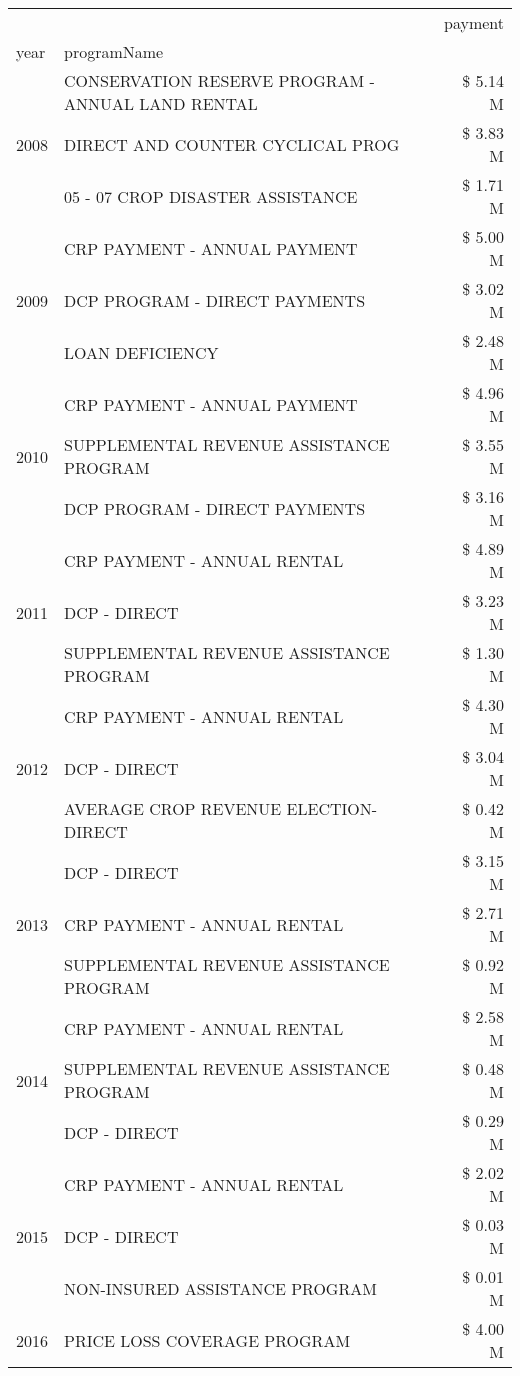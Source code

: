 \begin{tabular}{llr}
\toprule
 &  & payment \\
year & programName &  \\
\midrule
\multirow[t]{3}{*}{2008} & CONSERVATION RESERVE PROGRAM - ANNUAL LAND RENTAL & \$ 5.14 M \\
 & DIRECT AND COUNTER CYCLICAL PROG & \$ 3.83 M \\
 & 05 - 07 CROP DISASTER ASSISTANCE & \$ 1.71 M \\
\cline{1-3}
\multirow[t]{3}{*}{2009} & CRP PAYMENT - ANNUAL PAYMENT & \$ 5.00 M \\
 & DCP PROGRAM - DIRECT PAYMENTS & \$ 3.02 M \\
 & LOAN DEFICIENCY & \$ 2.48 M \\
\cline{1-3}
\multirow[t]{3}{*}{2010} & CRP PAYMENT - ANNUAL PAYMENT & \$ 4.96 M \\
 & SUPPLEMENTAL REVENUE ASSISTANCE PROGRAM & \$ 3.55 M \\
 & DCP PROGRAM - DIRECT PAYMENTS & \$ 3.16 M \\
\cline{1-3}
\multirow[t]{3}{*}{2011} & CRP PAYMENT - ANNUAL RENTAL & \$ 4.89 M \\
 & DCP - DIRECT & \$ 3.23 M \\
 & SUPPLEMENTAL REVENUE ASSISTANCE PROGRAM & \$ 1.30 M \\
\cline{1-3}
\multirow[t]{3}{*}{2012} & CRP PAYMENT - ANNUAL RENTAL & \$ 4.30 M \\
 & DCP - DIRECT & \$ 3.04 M \\
 & AVERAGE CROP REVENUE ELECTION-DIRECT & \$ 0.42 M \\
\cline{1-3}
\multirow[t]{3}{*}{2013} & DCP - DIRECT & \$ 3.15 M \\
 & CRP PAYMENT - ANNUAL RENTAL & \$ 2.71 M \\
 & SUPPLEMENTAL REVENUE ASSISTANCE PROGRAM & \$ 0.92 M \\
\cline{1-3}
\multirow[t]{3}{*}{2014} & CRP PAYMENT - ANNUAL RENTAL & \$ 2.58 M \\
 & SUPPLEMENTAL REVENUE ASSISTANCE PROGRAM & \$ 0.48 M \\
 & DCP - DIRECT & \$ 0.29 M \\
\cline{1-3}
\multirow[t]{3}{*}{2015} & CRP PAYMENT - ANNUAL RENTAL & \$ 2.02 M \\
 & DCP - DIRECT & \$ 0.03 M \\
 & NON-INSURED ASSISTANCE PROGRAM & \$ 0.01 M \\
\cline{1-3}
\multirow[t]{3}{*}{2016} & PRICE LOSS COVERAGE PROGRAM & \$ 4.00 M \\

\end{tabular}
